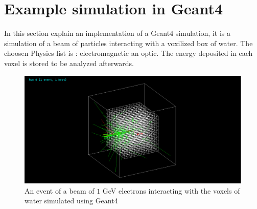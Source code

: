 \documentclass[11pt,a4paper]{report}
\begin{document}
	\chapter{\sc Example simulation in Geant4}

	In this section explain an implementation of a Geant4 simulation, it is a simulation of a beam of particles interacting with a voxilized  box of water.
	The choosen Physics list is : electromagnetic an optic.
	The energy deposited in each voxel is stored to be analyzed afterwards.

	\begin{center}
	\begin{figure}[h]
		\includegraphics[scale=0.25]{imgs/sim_beam.png}
		\centering
		\caption{An event of a beam of $1$ GeV electrons interacting with the voxels of water simulated using Geant4}
	\end{figure}
	\end{center}
\end{document}
